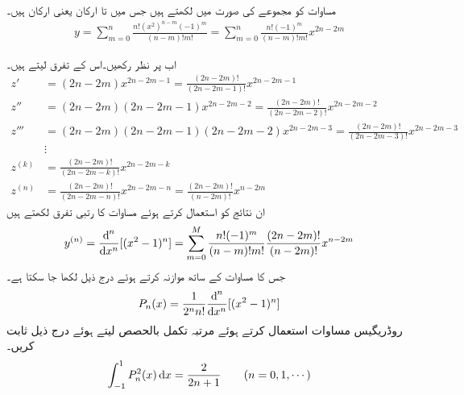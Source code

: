  مساوات  کو مجموعے کی صورت میں لکھتے ہیں جس میں  تا  ارکان  یعنی  ارکان ہیں۔
\begin{align}\label{مساوات_سوال_بیسل_الکرازی_ب}
y=\sum_{m=0}^{n} \frac{n!(x^2)^{n-m}(-1)^m}{(n-m)!m!}=\sum_{m=0}^{n} \frac{n!(-1)^m}{(n-m)!m!}x^{2n-2m}
\end{align}

اب  پر نظر رکھیں۔اس کے تفرق لیتے ہیں۔
\begin{align*}
z'&=(2n-2m)x^{2n-2m-1}=\frac{(2n-2m)!}{(2n-2m-1)!}x^{2n-2m-1}\\
z''&=(2n-2m)(2n-2m-1)x^{2n-2m-2}=\frac{(2n-2m)!}{(2n-2m-2)!}x^{2n-2m-2}\\
z'''&=(2n-2m)(2n-2m-1)(2n-2m-2)x^{2n-2m-3}=\frac{(2n-2m)!}{(2n-2m-3)!}x^{2n-2m-3}\\
&\vdots\\
z^{(k)}&=\frac{(2n-2m)!}{(2n-2m-k)!}x^{2n-2m-k}\\
z^{(n)}&=\frac{(2n-2m)!}{(2n-2m-n)!}x^{2n-2m-n}=\frac{(2n-2m)!}{(n-2m)!}x^{n-2m}
\end{align*}
ان نتائج  کو استعمال کرتے ہوئے مساوات  کا  رتبی تفرق لکھتے ہیں
 \begin{align*}
y^{(n)}=\frac{\dif^{\,n}}{\dif x^n}[(x^2-1)^n]=\sum_{m=0}^{M} \frac{n!(-1)^m}{(n-m)!m!}\frac{(2n-2m)!}{(n-2m)!}x^{n-2m}
\end{align*}
جس کا مساوات  کے ساتھ موازنہ کرتے ہوئے درج ذیل لکھا جا سکتا ہے۔
\begin{align*}
P_n(x)=\frac{1}{2^n n!}\frac{\dif^{\,n}}{\dif x^n}[(x^2-1)^n]
\end{align*}
روڈریگیس مساوات  استعمال کرتے ہوئے  مرتبہ تکمل بالحصص لیتے ہوئے درج ذیل ثابت کریں۔
\begin{align*}
\int_{-1}^{1} P_n^2(x) \dif x=\frac{2}{2n+1}\quad \quad (n=0,1,\cdots)
\end{align*}

